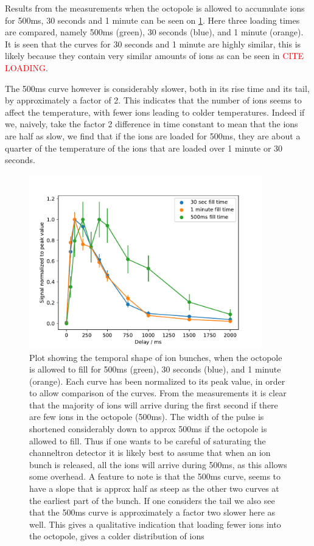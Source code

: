 Results from the measurements when the octopole is allowed to accumulate ions for 500ms, 30 seconds and 1 minute can be seen on 
\cref{fig:bunchShape}. Here three loading times are compared, namely 500ms (green), 30 seconds (blue), and 1 minute (orange).
It is seen that the curves for 30 seconds and 1 minute are highly similar, this is likely because they contain very similar amounts of ions as can be seen in \textcolor{red}{CITE LOADING}.

The 500ms curve however is considerably slower, both in its rise time and its tail, by approximately a factor of 2. This indicates that the number of ions seems to affect the temperature, with fewer ions leading to colder temperatures.
Indeed if we, naively, take the factor 2 difference in time constant to mean that the ions are half as slow, we find that if the ions are loaded for 500ms, they are about a quarter 
of the temperature of the ions that are loaded over 1 minute or 30 seconds.
\begin{figure}[h]
    \centering
    \includegraphics[width = 0.9\textwidth]{main/chargeShape.pdf}
    \caption{Plot showing the temporal shape of ion bunches, when the octopole is allowed to fill for 500ms (green), 30 seconds (blue), and 1 minute (orange).
    Each curve has been normalized to its peak value, in order to allow comparison of the curves. From the measurements it is clear that the majority of ions will arrive during the first second if there are few ions in the octopole (500ms).
    The width of the pulse is shortened considerably down to approx 500ms if the octopole is allowed to fill. Thus if one wants to be careful of saturating the channeltron detector it is likely best to assume that when an ion bunch is released, all the ions will arrive during 500ms, as this allows some overhead.
    A feature to note is that the 500ms curve, seems to have a slope that is approx half as steep as the other two curves at the earliest part of the bunch.
    If one considers the tail we also see that the 500ms curve is approximately a factor two slower here as well. This gives a qualitative indication that loading fewer ions into the octopole, gives a colder distribution of ions}
    \label{fig:bunchShape}
\end{figure}

